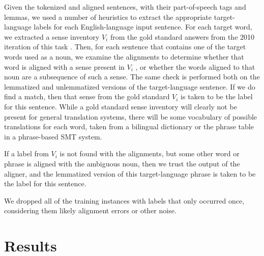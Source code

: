 \documentclass[11pt,letterpaper]{article}
\begin{document}
Given the tokenized and aligned sentences, with their part-of-speech tags and
lemmas, we used a number of heuristics to extract the appropriate
target-language labels for each English-language input sentence.  For each
target word, we extracted a sense inventory $V_i$ from the gold standard
answers from the 2010 iteration of this task \cite{lefever-hoste:2009:SEW}.
Then, for each sentence that contains one of the target words used as a noun,
we examine the alignments to determine whether that word is aligned with a
sense present in $V_i$ , or whether the words aligned to that noun are a
subsequence of such a sense. The same check is performed both on the lemmatized
and unlemmatized versions of the target-language sentence. If we do find a
match, then that sense from the gold standard $V_i$ is taken to be the label
for this sentence. While a gold standard sense inventory will clearly not be
present for general translation systems, there will be some vocabulary of
possible translations for each word, taken from a bilingual dictionary or the
phrase table in a phrase-based SMT system.

If a label from $V_i$ is not found with the alignments, but some other word or
phrase is aligned with the ambiguous noun, then we trust the output of the
aligner, and the lemmatized version of this target-language phrase is taken to
be the label for this sentence.

We dropped all of the training instances with labels that only occurred once,
considering them likely alignment errors or other noise.


\section{Results}
\end{document}
